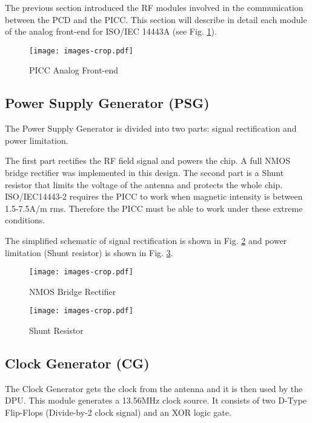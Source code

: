 The previous section introduced the RF modules involved in the communication between the PCD and the PICC. This section will describe in detail each module of the analog front-end for ISO/IEC 14443A (see Fig. \ref{fig:afe}).

\begin{figure}[]
  \centering
  \texttt{[image: images-crop.pdf]}
  \caption{PICC Analog Front-end}
  \label{fig:afe}
\end{figure}

\subsection{Power Supply Generator (PSG)}

The Power Supply Generator is divided into two parts: signal rectification and power limitation.

The first part rectifies the RF field signal and powers the chip. A full NMOS bridge rectifier \cite{rfid_rect1}\cite{rfid_rect2} was implemented in this design. The second part is a Shunt resistor that limits the voltage of the antenna and protects the whole chip. ISO/IEC14443-2 requires the PICC to work when magnetic intensity is between 1.5-7.5A/m rms. Therefore the PICC must be able to work under these extreme conditions.  

The simplified schematic of signal rectification is shown in Fig. \ref{fig:rect} and power limitation (Shunt resistor) is shown in Fig. \ref{fig:shunt}.

\begin{figure}[h]
  \centering
  \texttt{[image: images-crop.pdf]}
  \caption{NMOS Bridge Rectifier}
  \label{fig:rect}
\end{figure}

\begin{figure}[h]
  \centering
  \texttt{[image: images-crop.pdf]}
  \caption{Shunt Resistor}
  \label{fig:shunt}
\end{figure}

\subsection{Clock Generator (CG)}

The Clock Generator gets the clock from the antenna and it is then used by the DPU. This module generates a 13.56MHz clock source. It consists of two D-Type Flip-Flops (Divide-by-2 clock signal) and an XOR logic gate. 

